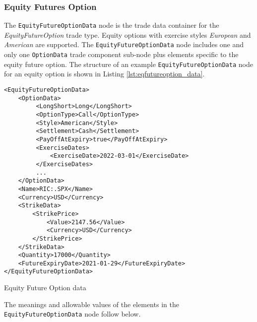 \subsubsection{Equity Futures Option}

The \lstinline!EquityFutureOptionData!  node is the trade data container for the \emph{EquityFutureOption} trade type.  Equity 
options with exercise styles \emph{European} and \emph{American} are supported. The \lstinline!EquityFutureOptionData!  node includes one and 
only one \lstinline!OptionData! trade component sub-node plus elements specific to the equity future option. The structure of 
an example \lstinline!EquityFutureOptionData! node for an equity option is shown in Listing
\ref{lst:eqfutureoption_data}.

\begin{listing}[H]
\begin{verbatim}
<EquityFutureOptionData>
    <OptionData>
         <LongShort>Long</LongShort>
         <OptionType>Call</OptionType>
         <Style>American</Style>
         <Settlement>Cash</Settlement>
         <PayOffAtExpiry>true</PayOffAtExpiry>
         <ExerciseDates>
             <ExerciseDate>2022-03-01</ExerciseDate>
         </ExerciseDates>
         ...
    </OptionData>
    <Name>RIC:.SPX</Name>
    <Currency>USD</Currency>
    <StrikeData>
		<StrikePrice>
			<Value>2147.56</Value>
			<Currency>USD</Currency>
		</StrikePrice>
	</StrikeData>
    <Quantity>17000</Quantity>
    <FutureExpiryDate>2021-01-29</FutureExpiryDate>
</EquityFutureOptionData>
\end{verbatim}
\caption{Equity Future Option data}
\label{lst:eqfutureoption_data}
\end{listing}

The meanings and allowable values of the elements in the \lstinline!EquityFutureOptionData!  node follow below.

